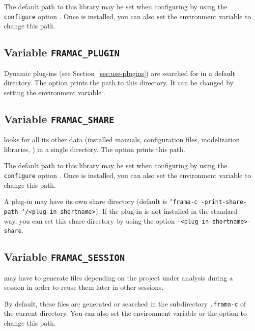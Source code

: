 The default path to this library may be set when configuring \FramaC by using
the \texttt{configure} option . Once \FramaC is
installed, you can also set the environment variable 
to change this path.

\subsection{Variable \texttt{FRAMAC\_PLUGIN}}\label{sec:var-plugin}

Dynamic plug-ins (see Section~\ref{sec:use-plugins}) are searched for in a default
directory. The \FramaC option  prints the path
to this directory. It can be changed by setting the environment variable
.

\subsection{Variable \texttt{FRAMAC\_SHARE}}\label{sec:var-share}

\FramaC looks for all its other data (installed manuals, configuration files,
\C modelization libraries, \etc) in a single directory. The \FramaC option
 prints this path.

The default path to this library may be set when configuring \FramaC by using
the \texttt{configure} option . Once \FramaC is
installed, you can also set the environment variable
 to change this path.

A \FramaC plug-in may have its own share directory (default is \texttt{`frama-c
  -print-share-path `/<plug-in shortname>}). If the plug-in is not installed in
the standard way, you can set this share directory by using the option
\texttt{-<plug-in shortname>-share}.

\subsection{Variable \texttt{FRAMAC\_SESSION}}\label{sec:var-session}

\FramaC may have to generate files depending on the project under analysis
during a session in order to reuse them later in other sessions.

By default, these files are generated or searched in the subdirectory
\texttt{.frama-c} of the current directory. You can also set the environment
variable  or the option  to
change this path.

